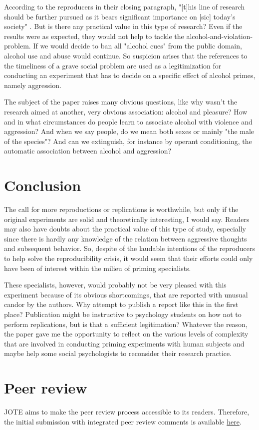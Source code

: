 \documentclass[twocolumn, serif, authordate, reflection]{jote-article}
\begin{document}
According to the reproducers in their closing paragraph, "[t]his line of research should be further pursued as it bears significant importance on [sic] today’s society" \parencite[p. 26]{Leboeuf2020}. But is there any practical value in this type of research? Even if the results were as expected, they would not help to tackle the alcohol-and-violation-problem. If we would decide to ban all "alcohol cues" from the public domain, alcohol use and abuse would continue. So suspicion arises that the references to the timeliness of a grave social problem are used as a legitimization for conducting an experiment that has to decide on a specific effect of alcohol primes, namely aggression.

The subject of the paper raises many obvious questions, like why wasn’t the research aimed at another, very obvious association: alcohol and pleasure? How and in what circumstances do people learn to associate alcohol with violence and aggression? And when we say people, do we mean both sexes or mainly "the male of the species"? And can we extinguish, for instance by operant conditioning, the automatic association between alcohol and aggression? 


{}
\section*{Conclusion}



The call for more reproductions or replications is worthwhile, but only if the original experiments are solid and theoretically interesting, I would say. Readers may also have doubts about the practical value of this type of study, especially since there is hardly any knowledge of the relation between aggressive thoughts and subsequent behavior. So, despite of the laudable intentions of the reproducers to help solve the reproducibility crisis, it would seem that their efforts could only have been of interest within the milieu of priming specialists.

These specialists, however, would probably not be very pleased with this experiment because of its obvious shortcomings, that are reported with unusual candor by the authors. Why attempt to publish a report like this in the first place? Publication might be instructive to psychology students on how not to perform replications, but is that a sufficient legitimation? Whatever the reason, the paper gave me the opportunity to reflect on the various levels of complexity that are involved in conducting priming experiments with human subjects and maybe help some social psychologists to reconsider their research practice.

{}
\section*{Peer review} 

JOTE aims to make the peer review process accessible to its readers. Therefore, the initial submission with integrated peer review comments is available \href{https://doi.org/10.36850/r1.pr1}{here}.

\printbibliography
\end{document}
